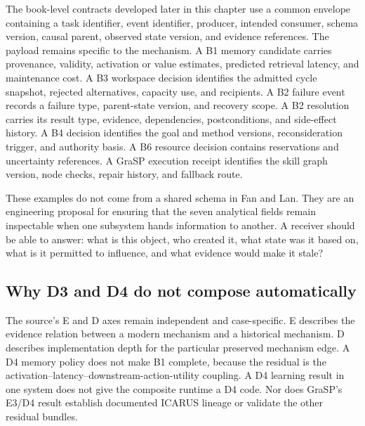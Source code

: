 The book-level contracts developed later in this chapter use a common envelope containing a task identifier, event identifier, producer, intended consumer, schema version, causal parent, observed state version, and evidence references. The payload remains specific to the mechanism. A B1 memory candidate carries provenance, validity, activation or value estimates, predicted retrieval latency, and maintenance cost. A B3 workspace decision identifies the admitted cycle snapshot, rejected alternatives, capacity use, and recipients. A B2 failure event records a failure type, parent-state version, and recovery scope. A B2 resolution carries its result type, evidence, dependencies, postconditions, and side-effect history. A B4 decision identifies the goal and method versions, reconsideration trigger, and authority basis. A B6 resource decision contains reservations and uncertainty references. A GraSP execution receipt identifies the skill graph version, node checks, repair history, and fallback route.

These examples do not come from a shared schema in Fan and Lan. They are an engineering proposal for ensuring that the seven analytical fields remain inspectable when one subsystem hands information to another. A receiver should be able to answer: what is this object, who created it, what state was it based on, what is it permitted to influence, and what evidence would make it stale?


\subsection{Why D3 and D4 do not compose automatically}
\label{subsec:ch18-d3-d4-composition}

The source's E and D axes remain independent and case-specific. E describes the evidence relation between a modern mechanism and a historical mechanism. D describes implementation depth for the particular preserved mechanism edge. A D4 memory policy does not make B1 complete, because the residual is the activation--latency--downstream-action-utility coupling. A D4 learning result in one system does not give the composite runtime a D4 code. Nor does GraSP's E3/D4 result establish documented ICARUS lineage or validate the other residual bundles.

